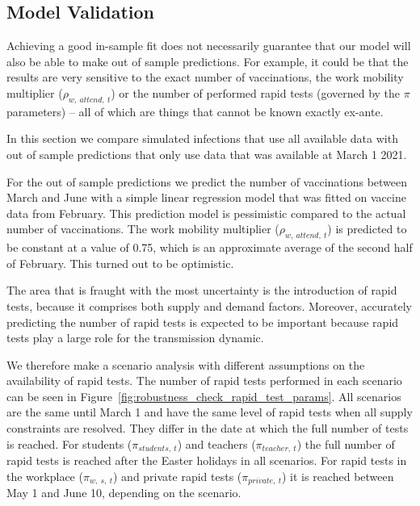 \subsection{Model Validation}
\label{subsec:model_validation}

Achieving a good in-sample fit does not necessarily guarantee that our model will also
be able to make out of sample predictions. For example, it could be that the results are
very sensitive to the exact number of vaccinations, the work mobility multiplier
($\rho_{w,\:attend,\:t}$) or the number of performed rapid tests (governed by the $\pi$
parameters) -- all of which are things that cannot be known exactly ex-ante.

In this section we compare simulated infections that use all available data with out of
sample predictions that only use data that was available at March 1 2021.

For the out of sample predictions we predict the number of vaccinations between March
and June with a simple linear regression model that was fitted on vaccine data from
February. This prediction model is pessimistic compared to the actual number of
vaccinations. The work mobility multiplier ($\rho_{w,\:attend,\:t}$) is predicted to be
constant at a value of 0.75, which is an approximate average of the second half of
February. This turned out to be optimistic.

The area that is fraught with the most uncertainty is the introduction of rapid tests,
because it comprises both supply and demand factors. Moreover, accurately predicting the
number of rapid tests is expected to be important because rapid tests play a large role
for the transmission dynamic.

We therefore make a scenario analysis with different assumptions on the availability of
rapid tests. The number of rapid tests performed in each scenario can be seen in
Figure~\ref{fig:robustness_check_rapid_test_params}. All scenarios are the same until
March 1 and have the same level of rapid tests when all supply constraints are resolved.
They differ in the date at which the full number of tests is reached. For students
($\pi_{students,\:t}$) and teachers ($\pi_{teacher,\:t}$) the full number of rapid tests
is reached after the Easter holidays in all scenarios. For rapid tests in the workplace
($\pi_{w,\:s,\:t}$) and private rapid tests ($\pi_{private,\:t}$) it is reached between
May 1 and June 10, depending on the scenario.


